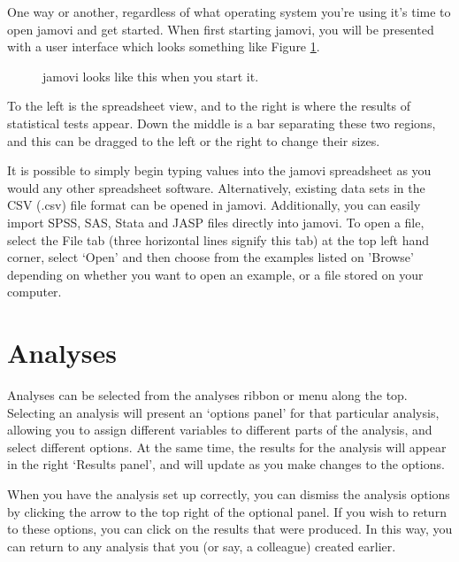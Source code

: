 
One way or another, regardless of what operating system you're using it's time to open jamovi and get started. When first starting jamovi, you will be presented with a user interface which looks something like Figure  \ref{fig:startingjamovi}.

\begin{figure}
\begin{center}
\caption{jamovi looks like this when you start it.}
\label{fig:startingjamovi}
\end{center}
\end{figure}

To the left is the spreadsheet view, and to the right is where the results of statistical tests appear. Down the middle is a bar separating these two regions, and this can be dragged to the left or the right to change their sizes. 

It is possible to simply begin typing values into the jamovi spreadsheet as you would any other spreadsheet software. Alternatively, existing data sets in the CSV (.csv) file format can be opened in jamovi. Additionally, you can easily import SPSS, SAS, Stata and JASP files directly into jamovi. To open a file, select the File tab (three horizontal lines signify this tab) at the top left hand corner, select ‘Open’ and then choose from the examples listed on 'Browse' depending on whether you want to open an example, or a file stored on your computer.


\section{Analyses\label{sec:analyses}}

Analyses can be selected from the analyses ribbon or menu along the top. Selecting an analysis will present an ‘options panel’ for that particular analysis, allowing you to assign different variables to different parts of the analysis, and select different options. At the same time, the results for the analysis will appear in the right ‘Results panel’, and will update as you make changes to the options.

When you have the analysis set up correctly, you can dismiss the analysis options by clicking the arrow to the top right of the optional panel. If you wish to return to these options, you can click on the results that were produced. In this way, you can return to any analysis that you (or say, a colleague) created earlier.

